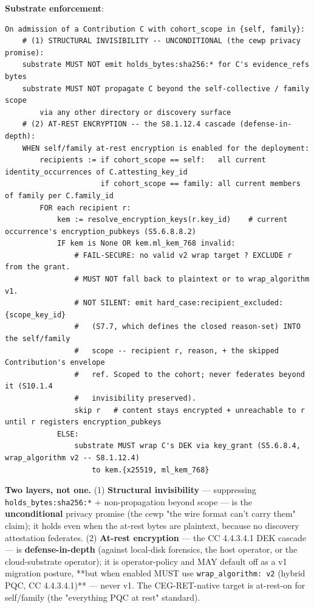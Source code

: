 \documentclass[11pt]{article}
\begin{document}
\textbf{Substrate enforcement}:


\begin{lstlisting}
On admission of a Contribution C with cohort_scope in {self, family}:
    # (1) STRUCTURAL INVISIBILITY -- UNCONDITIONAL (the cewp privacy promise):
    substrate MUST NOT emit holds_bytes:sha256:* for C's evidence_refs bytes
    substrate MUST NOT propagate C beyond the self-collective / family scope
        via any other directory or discovery surface
    # (2) AT-REST ENCRYPTION -- the S8.1.12.4 cascade (defense-in-depth):
    WHEN self/family at-rest encryption is enabled for the deployment:
        recipients := if cohort_scope == self:   all current identity_occurrences of C.attesting_key_id
                      if cohort_scope == family: all current members of family per C.family_id
        FOR each recipient r:
            kem := resolve_encryption_keys(r.key_id)    # current occurrence's encryption_pubkeys (S5.6.8.8.2)
            IF kem is None OR kem.ml_kem_768 invalid:
                # FAIL-SECURE: no valid v2 wrap target ? EXCLUDE r from the grant.
                # MUST NOT fall back to plaintext or to wrap_algorithm v1.
                # NOT SILENT: emit hard_case:recipient_excluded:{scope_key_id}
                #   (S7.7, which defines the closed reason-set) INTO the self/family
                #   scope -- recipient r, reason, + the skipped Contribution's envelope
                #   ref. Scoped to the cohort; never federates beyond it (S10.1.4
                #   invisibility preserved).
                skip r   # content stays encrypted + unreachable to r until r registers encryption_pubkeys
            ELSE:
                substrate MUST wrap C's DEK via key_grant (S5.6.8.4, wrap_algorithm v2 -- S8.1.12.4)
                    to kem.{x25519, ml_kem_768}
\end{lstlisting}

\textbf{Two layers, not one.} (1) \textbf{Structural invisibility} — suppressing \texttt{holds\_bytes:sha256:*} + non-propagation beyond scope — is the \textbf{unconditional} privacy promise (the cewp "the wire format can't carry them" claim); it holds even when the at-rest bytes are plaintext, because no discovery attestation federates. (2) \textbf{At-rest encryption} — the CC 4.4.3.4.1 DEK cascade — is \textbf{defense-in-depth} (against local-disk forensics, the host operator, or the cloud-substrate operator); it is operator-policy and MAY default off as a v1 migration posture, **but when enabled MUST use \texttt{wrap\_algorithm: v2} (hybrid PQC, CC 4.4.3.4.1)** — never v1. The CEG-RET-native target is at-rest-on for self/family (the "everything PQC at rest" standard).
\end{document}
